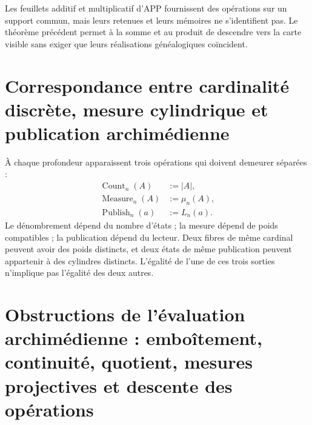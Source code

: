 Les feuillets additif et multiplicatif d'APP fournissent des opérations sur un
support commun, mais leurs retenues et leurs mémoires ne s'identifient pas. Le
théorème précédent permet à la somme et au produit de descendre vers la carte visible
sans exiger que leurs réalisations généalogiques coïncident.

\section{Correspondance entre cardinalité discrète, mesure cylindrique et publication archimédienne}

À chaque profondeur apparaissent trois opérations qui doivent demeurer
séparées :
\begin{align}
 \operatorname{Count}_n(A)&:=|A|,
 \label{p12-83-c18-s1:eq:operacion-conteo-u024}\\
 \operatorname{Measure}_n(A)&:=\mu_n(A),
 \label{p12-83-c18-s1:eq:operacion-medida-u024}\\
 \operatorname{Publish}_n(a)&:=L_n(a).
 \label{p12-83-c18-s1:eq:operacion-publicacion-u024}
\end{align}
Le dénombrement dépend du nombre d'états ; la mesure dépend de poids
compatibles ; la publication dépend du lecteur. Deux fibres de même
cardinal peuvent avoir des poids distincts, et deux états de même publication
peuvent appartenir à des cylindres distincts. L'égalité de l'une de ces trois
sorties n'implique pas l'égalité des deux autres.

\section{Obstructions de l'évaluation archimédienne : emboîtement, continuité, quotient, mesures projectives et descente des opérations}

